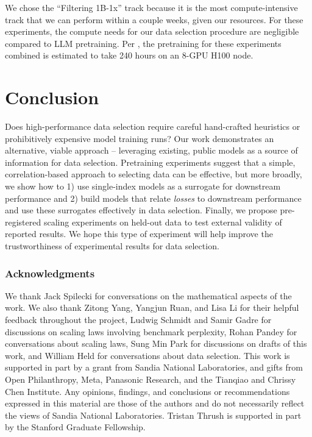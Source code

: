 \documentclass{article} %
\begin{document}
We chose the ``Filtering 1B-1x'' track because it is the most compute-intensive track that we can perform within a couple weeks, given our resources. For these experiments, the compute needs for our data selection procedure are negligible compared to LLM pretraining. Per \citet{datacomp}, the pretraining for these experiments combined is estimated to take 240 hours on an 8-GPU H100 node.

\section{Conclusion}
Does high-performance data selection require careful hand-crafted heuristics or prohibitively expensive model training runs? Our work demonstrates an alternative, viable approach -- leveraging existing, public models as a source of information for data selection. Pretraining experiments suggest that a simple, correlation-based approach to selecting data can be effective, but more broadly, we show how to 1) use single-index models as a surrogate for downstream performance and 2) build models that relate \emph{losses} to downstream performance and use these surrogates effectively in data selection. Finally, we propose pre-registered scaling experiments on held-out data to test external validity of reported results. We hope this type of experiment will help improve the trustworthiness of experimental results for data selection.

\subsubsection*{Acknowledgments}
We thank Jack Spilecki for conversations on the mathematical aspects of the work. We also thank Zitong Yang, Yangjun Ruan, and Lisa Li for their helpful feedback throughout the project, Ludwig Schmidt and Samir Gadre for discussions on scaling laws involving benchmark perplexity, Rohan Pandey for conversations about scaling laws, Sung Min Park for discussions on drafts of this work, and William Held for conversations about data selection.
This work is supported in part by a grant from Sandia National Laboratories, and gifts from Open Philanthropy, Meta, Panasonic Research, and the Tianqiao and Chrissy Chen Institute. Any opinions, findings, and conclusions or recommendations expressed in this material are those of the authors and do not necessarily reflect the views of Sandia National Laboratories. Tristan Thrush is supported in part by the Stanford Graduate Fellowship.
\end{document}
